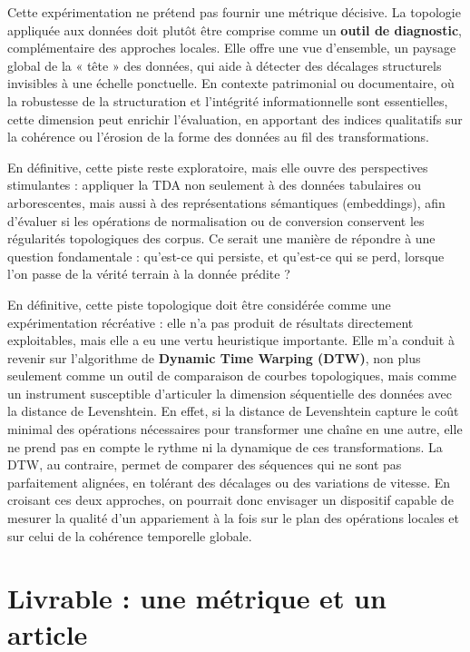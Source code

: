 Cette expérimentation ne prétend pas fournir une métrique décisive. La topologie appliquée aux données doit plutôt être comprise comme un \textbf{outil de diagnostic}, complémentaire des approches locales. Elle offre une vue d’ensemble, un paysage global de la « tête » des données, qui aide à détecter des décalages structurels invisibles à une échelle ponctuelle. En contexte patrimonial ou documentaire, où la robustesse de la structuration et l’intégrité informationnelle sont essentielles, cette dimension peut enrichir l’évaluation, en apportant des indices qualitatifs sur la cohérence ou l’érosion de la forme des données au fil des transformations.

En définitive, cette piste reste exploratoire, mais elle ouvre des perspectives stimulantes : appliquer la TDA non seulement à des données tabulaires ou arborescentes, mais aussi à des représentations sémantiques (embeddings), afin d’évaluer si les opérations de normalisation ou de conversion conservent les régularités topologiques des corpus. Ce serait une manière de répondre à une question fondamentale : qu’est-ce qui persiste, et qu’est-ce qui se perd, lorsque l’on passe de la vérité terrain à la donnée prédite ?

En définitive, cette piste topologique doit être considérée comme une expérimentation récréative : elle n’a pas produit de résultats directement exploitables, mais elle a eu une vertu heuristique importante. Elle m’a conduit à revenir sur l’algorithme de \textbf{Dynamic Time Warping (DTW)}, non plus seulement comme un outil de comparaison de courbes topologiques, mais comme un instrument susceptible d’articuler la dimension séquentielle des données avec la distance de Levenshtein. En effet, si la distance de Levenshtein capture le coût minimal des opérations nécessaires pour transformer une chaîne en une autre, elle ne prend pas en compte le rythme ni la dynamique de ces transformations. La DTW, au contraire, permet de comparer des séquences qui ne sont pas parfaitement alignées, en tolérant des décalages ou des variations de vitesse. En croisant ces deux approches, on pourrait donc envisager un dispositif capable de mesurer la qualité d’un appariement à la fois sur le plan des opérations locales et sur celui de la cohérence temporelle globale.

\chapter{Livrable : une métrique et un article}


